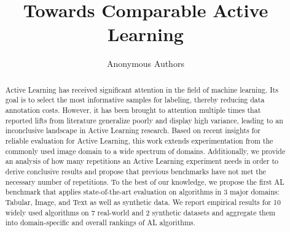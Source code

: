 \documentclass[]{article}
\title{Towards Comparable Active Learning}
\author{%
	Anonymous Authors
}
\begin{document}


\maketitle

\begin{abstract}
Active Learning has received significant attention in the field of machine learning. Its goal is to select the most informative samples for labeling, thereby reducing data annotation costs. 
However, it has been brought to attention multiple times that reported lifts from literature generalize poorly and display high variance, leading to an inconclusive landscape in Active Learning research.
Based on recent insights for reliable evaluation for Active Learning, this work extends experimentation from the commonly used image domain to a wide spectrum of domains.
Additionally, we provide an analysis of how many repetitions an Active Learning experiment needs in order to derive conclusive results and propose that previous benchmarks have not met the necessary number of repetitions.
To the best of our knowledge, we propose the first AL benchmark that applies state-of-the-art evaluation on algorithms in 3 major domains: Tabular, Image, and Text as well as synthetic data.
We report empirical results for 10 widely used algorithms on 7 real-world and 2 synthetic datasets and aggregate them into domain-specific and overall rankings of AL algorithms.
\end{abstract}
\end{document}
